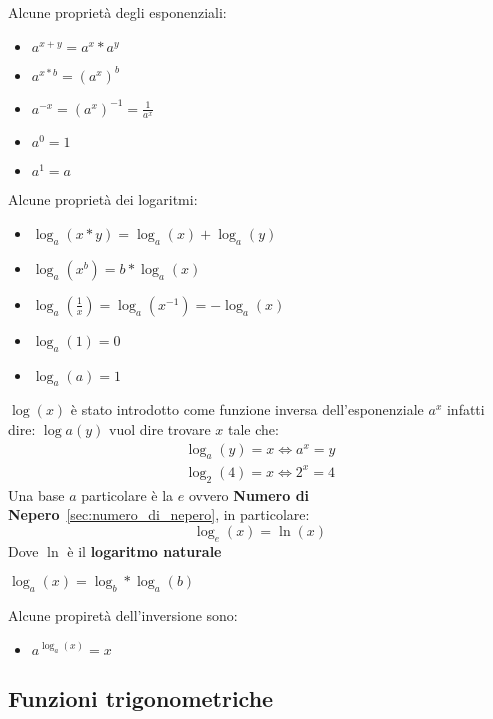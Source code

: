\documentclass[../main.tex, class=article]{subfiles}
\begin{document}
\begin{paracol}{2}
Alcune proprietà degli esponenziali:
\begin{itemize}
        \item $a^{x+y} = a^x * a^y$
        \item $a^{x*b} = (a^x)^b$
        \item $a^{-x} = (a^x)^{-1} = \frac{1}{a^x}$
        \item $a^0 = 1$
        \item $a^1 = a$
\end{itemize}

\switchcolumn

Alcune proprietà dei logaritmi: 
\begin{itemize}
        \item $\log_a(x*y) = \log_a(x) + \log_a(y)$
        \item $\log_a(x^b) = b * \log_a(x) $
        \item $\log_a(\frac{1}{x}) = \log_a(x^{-1}) = -\log_a(x) $
        \item $\log_a(1) = 0$
        \item $\log_a(a) = 1$
\end{itemize}
\end{paracol}

\bigskip

$ \log(x) $ è stato introdotto come funzione inversa dell'esponenziale $ a^x $ infatti dire: $ \log a(y) $ vuol dire trovare $ x $ tale
che:
\begin{align*}
       \log_a(y) = x \Leftrightarrow a^x = y \\
       \log_2(4) = x \Leftrightarrow 2^x = 4
\end{align*}
Una base $ a $ particolare è la $ e $ ovvero \textbf{Numero di Nepero}~\ref{sec:numero_di_nepero}, in particolare:
\begin{equation*}
        \log_e(x) = \ln(x)
\end{equation*}
Dove $ \ln $ è il \textbf{logaritmo naturale}



$ \log_a(x) = \log_b * \log_a(b)$ 

Alcune propiretà dell'inversione sono:
\begin{itemize}
        \item $a^{\log_a(x)} = x$
\end{itemize}



\subsection{Funzioni trigonometriche}
\end{document}
